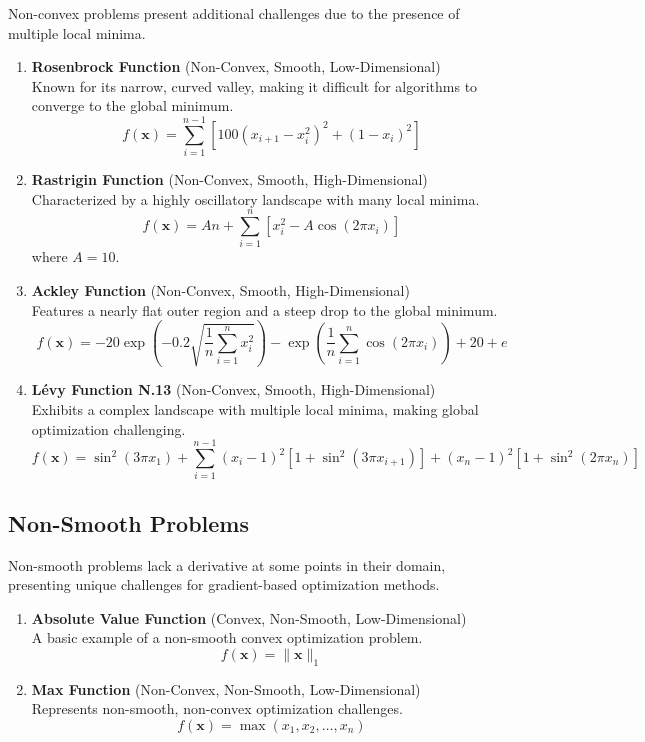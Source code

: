 \documentclass{article}
\begin{document}
Non-convex problems present additional challenges due to the presence of multiple local minima.

\begin{enumerate}
    \item \textbf{Rosenbrock Function} (Non-Convex, Smooth, Low-Dimensional) \\
    Known for its narrow, curved valley, making it difficult for algorithms to converge to the global minimum.
    \[ f(\mathbf{x}) = \sum_{i=1}^{n-1} [100(x_{i+1} - x_i^2)^2 + (1 - x_i)^2] \]

    \item \textbf{Rastrigin Function} (Non-Convex, Smooth, High-Dimensional) \\
    Characterized by a highly oscillatory landscape with many local minima.
    \[ f(\mathbf{x}) = An + \sum_{i=1}^{n} [x_i^2 - A \cos(2\pi x_i)] \]
    where $A = 10$.

    \item \textbf{Ackley Function} (Non-Convex, Smooth, High-Dimensional) \\
    Features a nearly flat outer region and a steep drop to the global minimum.
    \[ f(\mathbf{x}) = -20 \exp\left(-0.2 \sqrt{\frac{1}{n} \sum_{i=1}^{n} x_i^2}\right) - \exp\left(\frac{1}{n} \sum_{i=1}^{n} \cos(2\pi x_i)\right) + 20 + e \]

    \item \textbf{Lévy Function N.13} (Non-Convex, Smooth, High-Dimensional) \\
    Exhibits a complex landscape with multiple local minima, making global optimization challenging.
    \[ f(\mathbf{x}) = \sin^2(3\pi x_1) + \sum_{i=1}^{n-1} (x_i - 1)^2 [1 + \sin^2(3\pi x_{i+1})] + (x_n - 1)^2 [1 + \sin^2(2\pi x_n)] \]
\end{enumerate}

\subsection{Non-Smooth Problems}

Non-smooth problems lack a derivative at some points in their domain, presenting unique challenges for gradient-based optimization methods.

\begin{enumerate}
    \item \textbf{Absolute Value Function} (Convex, Non-Smooth, Low-Dimensional) \\
    A basic example of a non-smooth convex optimization problem.
    \[ f(\mathbf{x}) = \|\mathbf{x}\|_1 \]

    \item \textbf{Max Function} (Non-Convex, Non-Smooth, Low-Dimensional) \\
    Represents non-smooth, non-convex optimization challenges.
    \[ f(\mathbf{x}) = \max(x_1, x_2, \ldots, x_n) \]
\end{enumerate}
\end{document}
